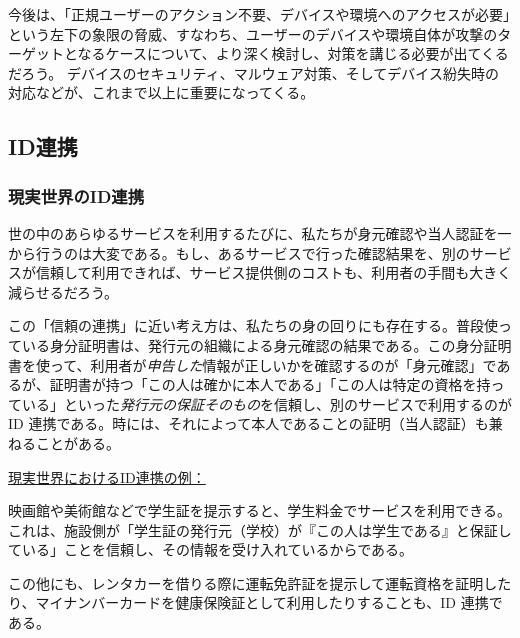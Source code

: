 \documentclass[uplatex]{jsarticle}
\def\label#1{}%
\begin{document}
今後は、「正規ユーザーのアクション不要、デバイスや環境へのアクセスが必要」という左下の象限の脅威、すなわち、ユーザーのデバイスや環境自体が攻撃のターゲットとなるケースについて、より深く検討し、対策を講じる必要が出てくるだろう。
デバイスのセキュリティ、マルウェア対策、そしてデバイス紛失時の対応などが、これまで以上に重要になってくる。


\subsection{ID連携}\label{subsec:ch2b-identity-federation}

\subsubsection{現実世界のID連携}

世の中のあらゆるサービスを利用するたびに、私たちが身元確認や当人認証を一から行うのは大変である。もし、あるサービスで行った確認結果を、別のサービスが信頼して利用できれば、サービス提供側のコストも、利用者の手間も大きく減らせるだろう。

この「信頼の連携」に近い考え方は、私たちの身の回りにも存在する。普段使っている身分証明書は、発行元の組織による身元確認の結果である。この身分証明書を使って、利用者が\emph{申告した}情報が正しいかを確認するのが「身元確認」であるが、証明書が持つ「この人は確かに本人である」「この人は特定の資格を持っている」といった\emph{発行元の保証そのもの}を信頼し、別のサービスで利用するのが ID 連携である。時には、それによって本人であることの証明（当人認証）も兼ねることがある。

\underline{現実世界におけるID連携の例：}

\begin{exa}[学生証による学生料金]\label{exa:ch2b-student-id}
映画館や美術館などで学生証を提示すると、学生料金でサービスを利用できる。これは、施設側が「学生証の発行元（学校）が『この人は学生である』と保証している」ことを信頼し、その情報を受け入れているからである。
\end{exa}

\begin{exa}[運転免許証とマイナンバーカードの利用]\label{exa:ch2b-license-mynumber}
この他にも、レンタカーを借りる際に運転免許証を提示して運転資格を証明したり、マイナンバーカードを健康保険証として利用したりすることも、ID 連携である。
\end{exa}
\end{document}
